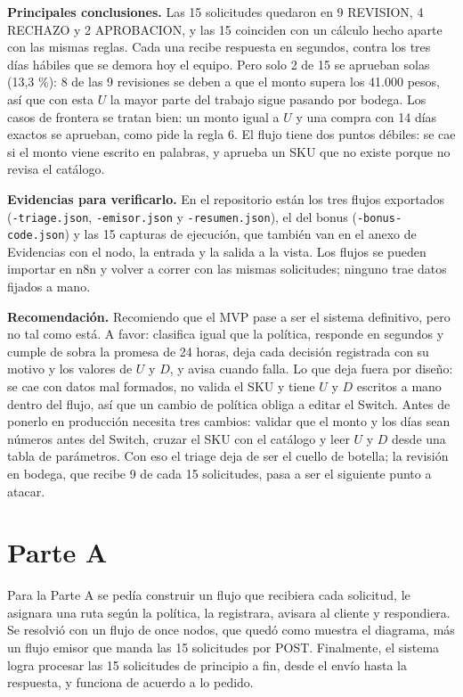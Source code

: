 \documentclass{article}
\begin{document}
\textbf{Principales conclusiones.} Las 15 solicitudes quedaron en 9 REVISION, 4 RECHAZO y 2
APROBACION, y las 15 coinciden con un cálculo hecho aparte con las mismas reglas. Cada una
recibe respuesta en segundos, contra los tres días hábiles que se demora hoy el equipo. Pero
solo 2 de 15 se aprueban solas (13,3 \%): 8 de las 9 revisiones se deben a que el monto supera
los 41.000 pesos, así que con esta $U$ la mayor parte del trabajo sigue pasando por bodega.
Los casos de frontera se tratan bien: un monto igual a $U$ y una compra con 14 días exactos
se aprueban, como pide la regla 6. El flujo tiene dos puntos débiles: se cae si el monto
viene escrito en palabras, y aprueba un SKU que no existe porque no revisa el catálogo.

\textbf{Evidencias para verificarlo.} En el repositorio están los tres flujos exportados
(\texttt{-triage.json}, \texttt{-emisor.json} y \texttt{-resumen.json}), el del bonus
(\texttt{-bonus-code.json}) y las 15 capturas de ejecución, que también van en el anexo de
Evidencias con el nodo, la entrada y la salida a la vista. Los flujos se pueden importar en
n8n y volver a correr con las mismas solicitudes; ninguno trae datos fijados a mano.

\textbf{Recomendación.} Recomiendo que el MVP pase a ser el sistema definitivo, pero no tal
como está. A favor: clasifica igual que la política, responde en segundos y cumple de sobra
la promesa de 24 horas, deja cada decisión registrada con su motivo y los valores de $U$ y $D$,
y avisa cuando falla. Lo que deja fuera por diseño: se cae con datos mal formados, no valida el SKU y tiene
$U$ y $D$ escritos a mano dentro del flujo, así que un cambio de política obliga a editar el
Switch. Antes de ponerlo en producción necesita tres cambios: validar que el monto y los días
sean números antes del Switch, cruzar el SKU con el catálogo y leer $U$ y $D$ desde una tabla
de parámetros. Con eso el triage deja de ser el cuello de botella; la revisión en bodega, que recibe 9 de
cada 15 solicitudes, pasa a ser el siguiente punto a atacar.

\newpage
\section*{Parte A}
Para la Parte A se pedía construir un flujo que recibiera cada
solicitud, le asignara una ruta según la política, la registrara, avisara al cliente y
respondiera. Se resolvió con un flujo de once nodos, que quedó como muestra el diagrama, más un
flujo emisor que manda las 15 solicitudes por POST. Finalmente, el sistema logra procesar las
15 solicitudes de principio a fin, desde el envío hasta la respuesta, y funciona de acuerdo a
lo pedido.
\end{document}
